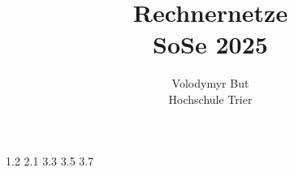 \documentclass[10pt, oneside]{article}
\title{Rechnernetze\\[10pt]\Large{SoSe 2025}}
\author{Volodymyr But\\[10pt]Hochschule Trier}
\date{}
\begin{document}
\maketitle
\vspace{25px}

{1.2}
{2.1}
{3.3}
{3.5}
\pagebreak
{3.7}
\end{document}
